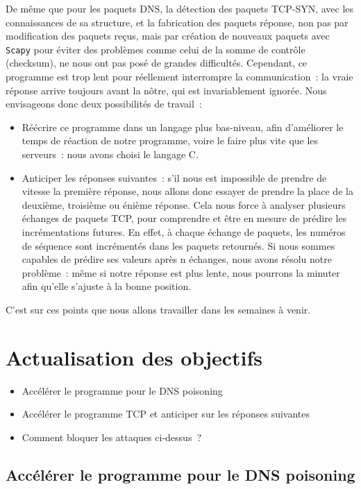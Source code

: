 \documentclass[a4paper, 12pt,twoside]{article}
\begin{document}
      De même que pour les paquets DNS, la détection des paquets TCP-SYN, avec les connaissances de sa structure, et la fabrication des paquets réponse, non pas par modification des paquets reçus, mais par création de nouveaux paquets avec \verb!Scapy! pour éviter des problèmes comme celui de la somme de contrôle (checksum), ne nous ont pas posé de grandes difficultés. Cependant, ce programme est trop lent pour réellement interrompre la communication~: la vraie réponse arrive toujours avant la nôtre, qui est invariablement ignorée. Nous envisageons donc deux possibilités de travail~:
  \begin{itemize}[label=\color{bleu303}\textbullet{}]
      \item Réécrire ce programme dans un langage plus bas-niveau, afin d'améliorer le temps de réaction de notre programme, voire le faire plus vite que les serveurs~: nous avons choisi le langage C.
      \item Anticiper les réponses suivantes~: s'il nous est impossible de prendre de vitesse la première réponse, nous allons donc essayer de prendre la place de la deuxième, troisième ou énième réponse. Cela nous force à analyser plusieurs échanges de paquets TCP, pour comprendre et être en mesure de prédire les incrémentations futures. En effet, à chaque échange de paquets, les numéros de séquence sont incrémentés dans les paquets retournés. Si nous sommes capables de prédire ses valeurs après n échanges, nous avons résolu notre problème~: même si notre réponse est plus lente, nous pourrons la minuter afin qu'elle s'ajuste à la bonne position.
  \end{itemize}


  C'est sur ces points que nous allons travailler dans les semaines à venir.
\newpage

\section{Actualisation des objectifs}

    \begin{itemize}[label=\color{bleu303}\textbullet{}]
        \item Accélérer le programme pour le DNS poisoning
        \item Accélérer le programme TCP et anticiper sur les réponses suivantes
        \item Comment bloquer les attaques ci-dessus~?
    \end{itemize}

	\subsection{Accélérer le programme pour le DNS poisoning}
	
\end{document}
